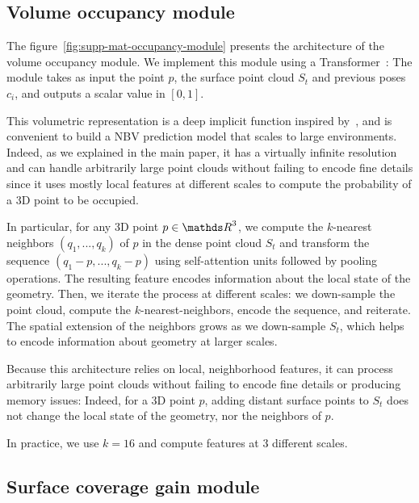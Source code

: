 \subsection{Volume occupancy module}



The figure~\ref{fig:supp-mat-occupancy-module} presents the architecture of the volume occupancy module. We implement this module using a Transformer~\cite{vaswani-nips17-attentionisallyouneed}: The module takes as input the point $p$, the surface point cloud $S_t$ and previous poses $c_i$, and outputs a scalar value in $[0, 1]$. 

This volumetric representation is a deep implicit function inspired by~\cite{guedon-nips22-scone-surface-coverage}, and is convenient to build a NBV prediction model that scales to large environments. Indeed, as we explained in the main paper, it has a virtually infinite resolution and can handle arbitrarily large point clouds without failing to encode fine details since it uses mostly local features at different scales to compute the probability of a 3D point to be occupied.

In particular, for any 3D point $p\in\IR^3$, we compute the $k$-nearest neighbors $(q_1,...,q_k)$ of $p$ in the dense point cloud $S_t$ and transform the sequence $(q_1-p,...,q_k-p)$ using self-attention units followed by pooling operations. The resulting feature encodes information about the local state of the geometry.
Then, we iterate the process at different scales: we down-sample the point cloud, compute the $k$-nearest-neighbors, encode the sequence, and reiterate. The spatial extension of the neighbors grows as we down-sample $S_t$, which helps to encode information about geometry at larger scales.

Because this architecture relies on local, neighborhood features, it can process arbitrarily large point clouds without failing to encode fine details or producing memory issues: Indeed, for a 3D point $p$, adding distant surface points to $S_t$ does not change the local state of the geometry, nor the neighbors of $p$.

In practice, we use $k=16$ and compute features at 3 different scales.
%

\subsection{Surface coverage gain module}


